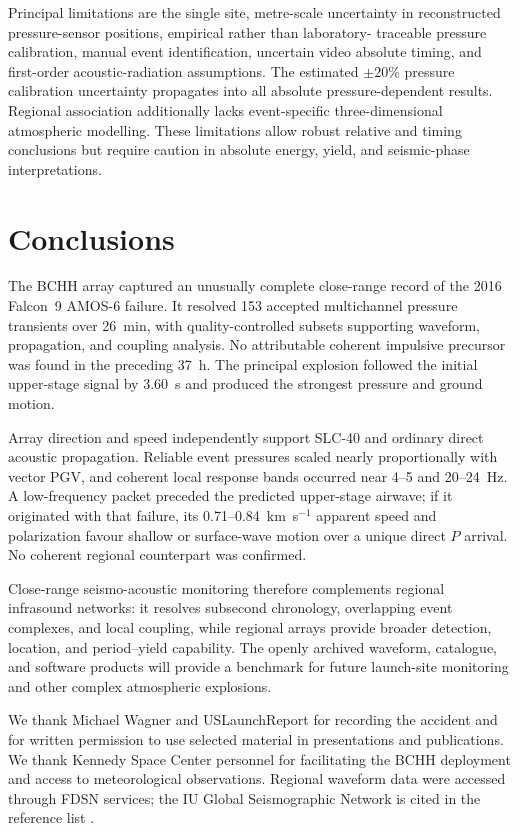 \documentclass[]{seismica}
\begin{document}
Principal limitations are the single site, metre-scale uncertainty in
reconstructed pressure-sensor positions, empirical rather than laboratory-
traceable pressure calibration, manual event identification, uncertain video
absolute timing, and first-order acoustic-radiation assumptions. The estimated
$\pm20\%$ pressure calibration uncertainty propagates into all absolute
pressure-dependent results. Regional association additionally lacks
event-specific three-dimensional atmospheric modelling. These limitations
allow robust relative and timing conclusions but require caution in absolute
energy, yield, and seismic-phase interpretations.

\section{Conclusions}
\label{sec:conclusions}

The BCHH array captured an unusually complete close-range record of the 2016
Falcon~9 AMOS-6 failure. It resolved 153 accepted multichannel pressure
transients over 26~min, with quality-controlled subsets supporting waveform,
propagation, and coupling analysis. No attributable coherent impulsive
precursor was found in the preceding 37~h. The principal explosion followed
the initial upper-stage signal by 3.60~s and produced the strongest pressure
and ground motion.

Array direction and speed independently support SLC-40 and ordinary direct
acoustic propagation. Reliable event pressures scaled nearly proportionally
with vector PGV, and coherent local response bands occurred near 4--5 and
20--24~Hz. A low-frequency packet preceded the predicted upper-stage airwave;
if it originated with that failure, its 0.71--0.84~km~s$^{-1}$ apparent speed
and polarization favour shallow or surface-wave motion over a unique direct
$P$ arrival. No coherent regional counterpart was confirmed.

Close-range seismo-acoustic monitoring therefore complements regional
infrasound networks: it resolves subsecond chronology, overlapping event
complexes, and local coupling, while regional arrays provide broader detection,
location, and period--yield capability. The openly archived waveform,
catalogue, and software products will provide a benchmark for future
launch-site monitoring and other complex atmospheric explosions.

\begin{acknowledgements}
We thank Michael Wagner and USLaunchReport for recording the accident and for
written permission to use selected material in presentations and publications.
We thank Kennedy Space Center personnel for facilitating the BCHH deployment
and access to meteorological observations. Regional waveform data were
accessed through FDSN services; the IU Global Seismographic Network is cited
in the reference list \citep{asl_gsn_iu_1988}.
\end{acknowledgements}
\end{document}
